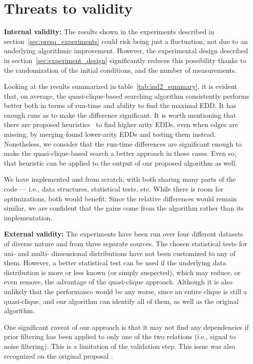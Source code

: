 \section{Threats to validity}
\label{sec:threats}

\textbf{Internal validity:} The results shown in the
experiments described in section~\ref{sec:presq_experiments} could risk being just a fluctuation,
not due to an underlying algorithmic improvement. However,
the experimental design described in section~\ref{sec:experiment_design} significantly reduces
this possibility thanks to the randomization of the initial conditions,
and the number of measurements.

Looking at the results summarized in table~\ref{tab:ind2_summary},
it is evident that, on average, the quasi-clique-based searching algorithm consistently performs
better both in terms of run-time and ability to find the maximal EDD.
It has enough runs as to make the difference significant.
It is worth mentioning that there are proposed heuristics~\cite{koeller2003discovery} to find higher
arity \glspl{EDD}, even when edges are missing, by merging found lower-arity \glspl{EDD} and testing them
instead.
Nonetheless, we consider that the run-time differences are significant enough to make
the quasi-clique-based search a better approach in those cases.
Even so, that heuristic can be applied to the output of our proposed algorithm as well.

We have implemented \Find and \PresQ from scratch, with both sharing 
many parts of the code --- i.e., data structures, statistical tests, etc.
While there is room for optimizations, both would benefit.
Since the relative differences would remain similar, we are confident that the gains come from the 
algorithm rather than its implementation.

\textbf{External validity:} The experiments have been run over four different datasets of
diverse nature and from three separate sources. The chosen statistical tests for
uni- and multi- dimensional distributions have not been customized to any of them.
However, a better statistical test can be used if the underlying data distribution is more or
less known (or simply suspected), which may reduce, or even remove, the advantage of the
quasi-clique approach. Although it is also unlikely that the performance would be any worse,
since an entire clique is still a quasi-clique, and our algorithm can identify all of them, as
well as the original \Find algorithm.

One significant caveat of our approach is that it may not find
any dependencies if prior filtering has been applied to only one of the two relations
(i.e., signal to noise filtering). This is a limitation of the validation
step. This issue was also recognized on the original \Find proposal \cite{koeller2003discovery}.

